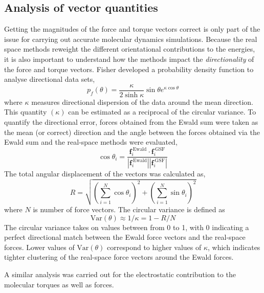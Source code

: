 \subsection{Analysis of vector quantities}
Getting the magnitudes of the force and torque vectors correct is only
part of the issue for carrying out accurate molecular dynamics
simulations.  Because the real space methods reweight the different
orientational contributions to the energies, it is also important to
understand how the methods impact the \textit{directionality} of the
force and torque vectors. Fisher developed a probability density
function to analyse directional data sets,
\begin{equation}
p_f(\theta) = \frac{\kappa}{2 \sinh\kappa}\sin\theta e^{\kappa \cos\theta}
\label{eq:pdf}
\end{equation}
where $\kappa$ measures directional dispersion of the data around the
mean direction.\cite{fisher53} This quantity $(\kappa)$ can be
estimated as a reciprocal of the circular variance.\cite{Allen91} To
quantify the directional error, forces obtained from the Ewald sum
were taken as the mean (or correct) direction and the angle between
the forces obtained via the Ewald sum and the real-space methods were
evaluated,
\begin{equation}
  \cos\theta_i =  \frac{\mathbf{f}_i^\mathrm{~Ewald} \cdot
    \mathbf{f}_i^\mathrm{~GSF}}{\left|\mathbf{f}_i^\mathrm{~Ewald}\right| \left|\mathbf{f}_i^\mathrm{~GSF}\right|}
\end{equation}
The total angular displacement of the vectors was calculated as,
\begin{equation}
R = \sqrt{\left(\sum\limits_{i=1}^N \cos\theta_i\right)^2 + \left(\sum\limits_{i=1}^N \sin\theta_i\right)^2}
\label{eq:displacement}
\end{equation} 
where $N$ is number of force vectors.  The circular variance is
defined as
\begin{equation}
\mathrm{Var}(\theta) \approx 1/\kappa = 1 - R/N
\end{equation}
The circular variance takes on values between from 0 to 1, with 0
indicating a perfect directional match between the Ewald force vectors
and the real-space forces. Lower values of $\mathrm{Var}(\theta)$
correspond to higher values of $\kappa$, which indicates tighter
clustering of the real-space force vectors around the Ewald forces.

A similar analysis was carried out for the electrostatic contribution
to the molecular torques as well as forces.  

